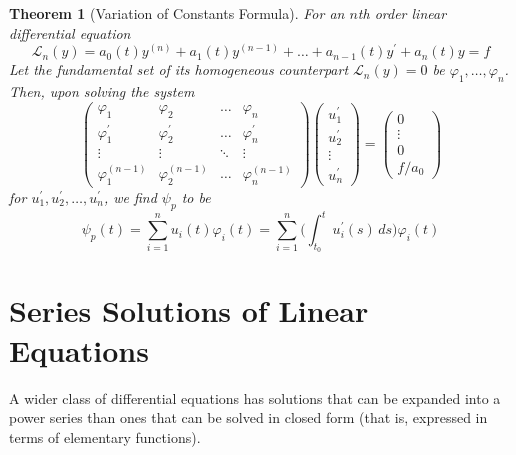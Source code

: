\documentclass{article}
\newtheorem{theorem}{Theorem}[section]
\theoremstyle{remark}
\theoremstyle{definition}
\begin{document}
\begin{theorem}[Variation of Constants Formula]
For an $n$th order linear differential equation 
\[\mathcal{L}_n (y) = a_0 (t) y^{(n)} + a_1 (t) y^{(n-1)} + \ldots + a_{n-1} (t) y^\prime + a_n (t) y = f\]
Let the fundamental set of its homogeneous counterpart $\mathcal{L}_n (y) = 0$ be $\varphi_1, \ldots, \varphi_n$. Then, upon solving the system 
\[\begin{pmatrix}
\varphi_1 & \varphi_2 & \ldots & \varphi_n \\
\varphi_1^\prime & \varphi_2^\prime & \ldots & \varphi_n^\prime\\
\vdots & \vdots & \ddots & \vdots \\
\varphi_1^{(n-1)} & \varphi_2^{(n-1)} & \ldots & \varphi_n^{(n-1)} 
\end{pmatrix} \begin{pmatrix}
u_1^\prime \\ u_2^\prime \\ \vdots \\ u_n^\prime 
\end{pmatrix} = \begin{pmatrix}
0 \\ \vdots \\ 0 \\ f / a_0
\end{pmatrix}\]
for $u_1^\prime, u_2^\prime, \ldots, u_n^\prime$, we find $\psi_p$ to be
\[\psi_p (t) = \sum_{i=1}^n u_i (t) \varphi_i(t) = \sum_{i=1}^n \Big( \int_{t_0}^t u_i^\prime (s)\,ds \Big) \varphi_i (t)\]
\end{theorem}


\section{Series Solutions of Linear Equations}
A wider class of differential equations has solutions that can be expanded into a power series than ones that can be solved in closed form (that is, expressed in terms of elementary functions). 
\end{document}
